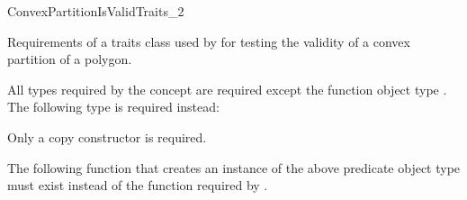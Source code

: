 
\renewcommand\ccRefPageBegin{\ccParDims\cgalColumnLayout\begin{ccAdvanced}}
\renewcommand\ccRefPageEnd{\ccParDims\cgalColumnLayout\end{ccAdvanced}}
\begin{ccRefConcept}{ConvexPartitionIsValidTraits_2}



\ccDefinition
  
Requirements of a traits class used 
by  for testing the validity of a
convex partition of a polygon.

\ccTypes

All types required by the concept  are required
except the function object type . The following type is
required instead:


\ccCreation

Only a copy constructor is required.


\ccOperations

The following function that creates an instance of the above predicate object
type must exist instead of the function  required by
.



\end{ccRefConcept}
